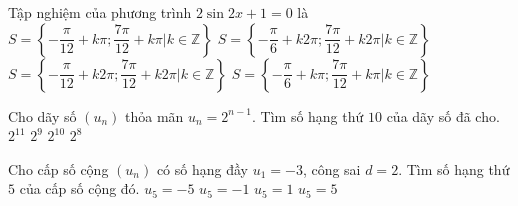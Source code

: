 \begin{ex}%
Tập nghiệm của phương trình $2 \sin 2x +1=0$ là
\choice
{\True $S=\left\{ -\dfrac{\pi}{12} + k\pi ; \dfrac{7\pi}{12} + k\pi | k \in \mathbb{Z} \right\}$}
{$S=\left\{ -\dfrac{\pi}{6} + k2\pi ; \dfrac{7\pi}{12} + k2\pi | k \in \mathbb{Z} \right\}$}
{$S=\left\{ -\dfrac{\pi}{12} + k2\pi ; \dfrac{7\pi}{12} + k2\pi | k \in \mathbb{Z} \right\}$}
{$S=\left\{ -\dfrac{\pi}{6} + k\pi ; \dfrac{7\pi}{12} + k\pi | k \in \mathbb{Z} \right\}$}
\end{ex}

\begin{ex}%
Cho dãy số $(u_n)$ thỏa mãn $u_n = 2^{n-1}$. Tìm số hạng thứ $10$ của dãy số đã cho.
\choice
{$2^{11}$}
{\True $2^9$}
{$2^{10}$}
{$2^8$}
\end{ex}

\begin{ex}%
Cho cấp số cộng $(u_n)$ có số hạng đầy $u_1 =-3$, công sai $d=2$. Tìm số hạng thứ $5$ của cấp số cộng đó.
\choice
{$u_5=-5$}
{$u_5=-1$}
{$u_5=1$}
{\True $u_5=5$}
\end{ex}


